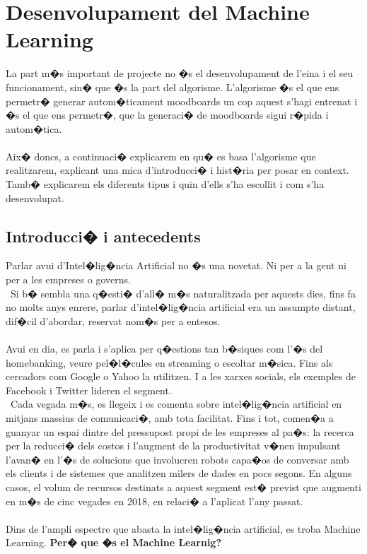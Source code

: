\documentclass[12pt,a4paper,openright,oneside]{article}
\numberwithin{equation}{section}
\theoremstyle{definition}
\begin{document}
\section{Desenvolupament del Machine Learning}
La part m�s important de projecte no �s el desenvolupament de l'eina i el seu funcionament, sin� que �s la part del algorisme. L'algorisme �s el que ens permetr� generar autom�ticament moodboards un cop aquest s'hagi entrenat i �s el que ens permetr�, que la generaci� de moodboards sigui r�pida i autom�tica.\\\\
Aix� doncs, a continuaci� explicarem en qu� es basa l'algorisme que realitzarem, explicant una mica d'introducci� i hist�ria per posar en context. Tamb� explicarem els diferents tipus i quin d'ells s'ha escollit i com s'ha desenvolupat.
\subsection{Introducci� i antecedents}
Parlar avui d'Intel�lig�ncia Artificial no �s una novetat. Ni per a la gent ni per a les empreses o governs.\\\
Si b� sembla una q�esti� d'all� m�s naturalitzada per aquests dies, fins fa no molts anys enrere, parlar d'intel�lig�ncia artificial era un assumpte distant, dif�cil d'abordar, reservat nom�s per a entesos.\\\\
Avui en dia, es parla i s'aplica per q�estions tan b�siques com l'�s del homebanking, veure pel�l�cules en streaming o escoltar m�sica. Fins als cercadors com Google o Yahoo la utilitzen. I a les xarxes socials, els exemples de Facebook i Twitter lideren el segment.\\\
Cada vegada m�s, es llegeix i es comenta sobre intel�lig�ncia artificial en mitjans massius de comunicaci�, amb tota facilitat. Fins i tot, comen�a a guanyar un espai dintre del pressupost propi de les empreses al pa�s: la recerca per la reducci� dels costos i l'augment de la productivitat v�nen impulsant l'avan� en l'�s de solucions que involucren robots capa�os de conversar amb els clients i de sistemes que analitzen milers de dades en pocs segons. En alguns casos, el volum de recursos destinats a aquest segment est� previst que augmenti en m�s de cinc vegades en 2018, en relaci� a l'aplicat l'any passat.\\\\
Dins de l'ampli espectre que abasta la intel�lig�ncia artificial, es troba Machine Learning. \textbf{Per� que �s el Machine Learnig?}
\end{document}
